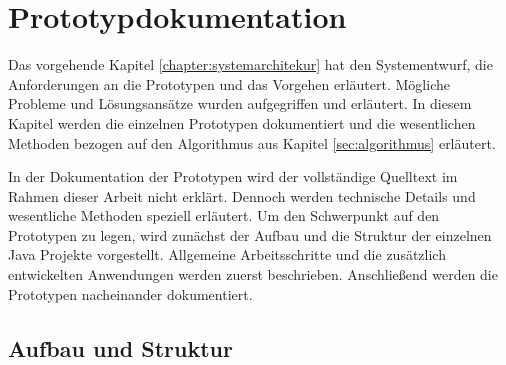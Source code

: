 \chapter{Prototypdokumentation}
\label{chapter:prototypeDocumentation}

Das vorgehende Kapitel \ref{chapter:systemarchitekur} hat den Systementwurf, die Anforderungen an die Prototypen und das Vorgehen erläutert. Mögliche Probleme und Lösungsansätze wurden aufgegriffen und erläutert. In diesem Kapitel werden die einzelnen Prototypen dokumentiert und die wesentlichen Methoden bezogen auf den Algorithmus aus Kapitel \ref{sec:algorithmus} erläutert. 

In der Dokumentation der Prototypen wird der vollständige Quelltext im Rahmen dieser Arbeit nicht erklärt. Dennoch werden technische Details und wesentliche Methoden speziell erläutert. Um den Schwerpunkt auf den Prototypen zu legen, wird zunächst der Aufbau und die Struktur der einzelnen Java Projekte vorgestellt. Allgemeine Arbeitsschritte und die zusätzlich entwickelten Anwendungen werden zuerst beschrieben. Anschließend werden die Prototypen nacheinander dokumentiert.


\section{Aufbau und Struktur}
\label{sec:prot:aufbauStruktur}


